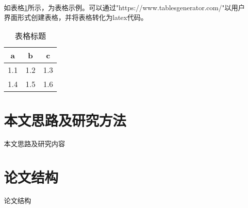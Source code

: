 如表格\ref{tb:table1}所示，为表格示例。可以通过"https://www.tablesgenerator.com/"以用户界面形式创建表格，并将表格转化为latex代码。

\begin{table}[]
	\caption{表格标题}
	\label{tb:table1}
	\centering
	\begin{tabular}{|c|c|c|}
		\hline
		a   & b   & c   \\ \hline
		1.1 & 1.2 & 1.3 \\ \hline
		1.4 & 1.5 & 1.6 \\ \hline
	\end{tabular}
\end{table}

\section{本文思路及研究方法}

本文思路及研究内容

\section{论文结构}

论文结构





